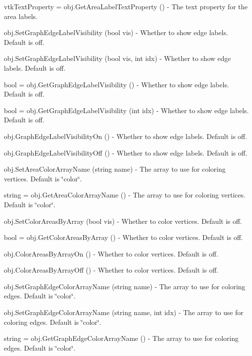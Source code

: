 \begin{DoxyItemize}
\item {\ttfamily vtk\-Text\-Property = obj.\-Get\-Area\-Label\-Text\-Property ()} -\/ The text property for the area labels.  
\item {\ttfamily obj.\-Set\-Graph\-Edge\-Label\-Visibility (bool vis)} -\/ Whether to show edge labels. Default is off.  
\item {\ttfamily obj.\-Set\-Graph\-Edge\-Label\-Visibility (bool vis, int idx)} -\/ Whether to show edge labels. Default is off.  
\item {\ttfamily bool = obj.\-Get\-Graph\-Edge\-Label\-Visibility ()} -\/ Whether to show edge labels. Default is off.  
\item {\ttfamily bool = obj.\-Get\-Graph\-Edge\-Label\-Visibility (int idx)} -\/ Whether to show edge labels. Default is off.  
\item {\ttfamily obj.\-Graph\-Edge\-Label\-Visibility\-On ()} -\/ Whether to show edge labels. Default is off.  
\item {\ttfamily obj.\-Graph\-Edge\-Label\-Visibility\-Off ()} -\/ Whether to show edge labels. Default is off.  
\item {\ttfamily obj.\-Set\-Area\-Color\-Array\-Name (string name)} -\/ The array to use for coloring vertices. Default is \char`\"{}color\char`\"{}.  
\item {\ttfamily string = obj.\-Get\-Area\-Color\-Array\-Name ()} -\/ The array to use for coloring vertices. Default is \char`\"{}color\char`\"{}.  
\item {\ttfamily obj.\-Set\-Color\-Areas\-By\-Array (bool vis)} -\/ Whether to color vertices. Default is off.  
\item {\ttfamily bool = obj.\-Get\-Color\-Areas\-By\-Array ()} -\/ Whether to color vertices. Default is off.  
\item {\ttfamily obj.\-Color\-Areas\-By\-Array\-On ()} -\/ Whether to color vertices. Default is off.  
\item {\ttfamily obj.\-Color\-Areas\-By\-Array\-Off ()} -\/ Whether to color vertices. Default is off.  
\item {\ttfamily obj.\-Set\-Graph\-Edge\-Color\-Array\-Name (string name)} -\/ The array to use for coloring edges. Default is \char`\"{}color\char`\"{}.  
\item {\ttfamily obj.\-Set\-Graph\-Edge\-Color\-Array\-Name (string name, int idx)} -\/ The array to use for coloring edges. Default is \char`\"{}color\char`\"{}.  
\item {\ttfamily string = obj.\-Get\-Graph\-Edge\-Color\-Array\-Name ()} -\/ The array to use for coloring edges. Default is \char`\"{}color\char`\"{}.  

\end{DoxyItemize}
